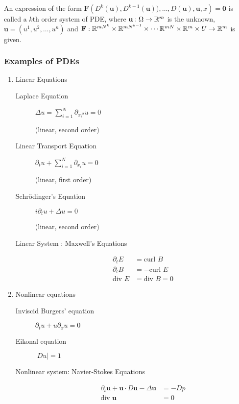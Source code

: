 \begin{definition}
An expression of the form $\mathbf{F} \left( D^k (\mathbf{u}), D^{k-1} (\mathbf {u})), \ldots , D (\mathbf{u}), \mathbf{u} , x \right)=\mathbf{0}$ is called a $k$th order system of PDE, where $\mathbf{u} : \Omega \to \mathbb R ^m$ is the unknown, $\mathbf{u}= \left( u^1 , u^2 , \ldots, u^n \right)$ and $\mathbf{F} : \mathbb R ^{mN^k} \times \mathbb R ^{mN^{k-1}} \times \cdots \mathbb R ^{mN} \times \mathbb R ^m \times U \to \mathbb R ^m$ is given.
    \label{def:system-of-pde}
\end{definition}



\subsubsection{Examples of PDEs}
\begin{enumerate}
    \item Linear Equations
	\begin{description}
	    \item[Laplace Equation] $\Delta u = \sum_{i=1}^{N} \partial _{{x_i}^{2}} u =0$ \begin{flushright}(linear, second order)\end{flushright}
	    \item [Linear Transport Equation] $\partial_t u + \sum_{i=1}^{N} \partial_{x_i} u =0$ \begin{flushright}(linear, first order)\end{flushright}
	    \item [Schrödinger's Equation] $i \partial_{t} u + \Delta u =0$ \begin{flushright}(linear, second order)\end{flushright}
	    \item [Linear System : Maxwell's Equations]
		\begin{align*}
		    \partial_t E &=\text{curl } B \\
		    \partial_t B &= - \text{curl } E \\
		    \text{div } E &= \text{div } B =0
		\end{align*}
	\end{description}

    \item Nonlinear equations
	\begin{description}
	    \item[Inviscid Burgers' equation] $\partial_{t} u + u \partial _x u = 0$
	    \item [Eikonal equation] $|Du| = 1$
	    \item [Nonlinear system: Navier-Stokes Equations] \begin{align*}\partial _t \mathbf{u} + \mathbf{u} \cdot D\mathbf{u} - \Delta \mathbf{u} &= -Dp  \\ \text{div } \mathbf{u} &=0\end{align*}
	\end{description}
\end{enumerate}

